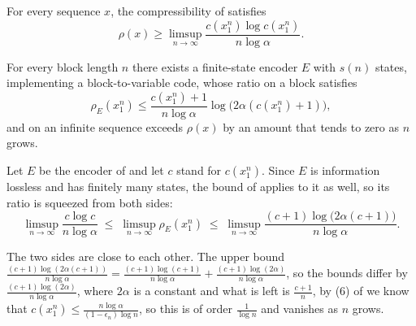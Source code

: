 
\begin{theorem}
\label{thm:lz78-lower}
    For every sequence \(x\), the compressibility of  satisfies
    \[
        \rho(x) \geq \limsup_{n \to \infty} \frac{c(x_1^n) \log c(x_1^n)}{n \log \alpha}.
    \]
\end{theorem}

\begin{theorem}
\label{thm:lz78-upper}
    For every block length \(n\) there exists a finite-state encoder \(E\) with \(s(n)\) states, implementing a block-to-variable code, whose ratio on a block satisfies
    \[
        \rho_E(x_1^n) \leq \frac{c(x_1^n) + 1}{n \log \alpha} \log \big( 2\alpha (c(x_1^n) + 1) \big),
    \]
    and on an infinite sequence exceeds \(\rho(x)\) by an amount that tends to zero as \(n\) grows.
\end{theorem}

\begin{corollary}
\label{cor:lz78-lower-upper}
    Let \(E\) be the encoder of  and let \(c\) stand for \(c(x_1^n)\). Since \(E\) is information lossless and has finitely many states, the bound of  applies to it as well, so its ratio is squeezed from both sides:
    \[
        \limsup_{n \to \infty} \frac{c \log c}{n \log \alpha}
        \;\leq\; \limsup_{n \to \infty} \rho_E(x_1^n) \;\leq\;
        \limsup_{n \to \infty} \frac{(c+1) \log\big(2\alpha(c+1)\big)}{n \log \alpha} .
    \]
\end{corollary}

\noindent The two sides are close to each other. The upper bound \(\frac{(c+1)\log(2\alpha(c+1))}{n \log \alpha} = \frac{(c+1)\log(c+1)}{n \log \alpha} + \frac{(c+1)\log(2\alpha)}{n \log \alpha}\), so the bounds differ by \(\frac{(c+1)\log(2\alpha)}{n \log \alpha}\), where \(2\alpha\) is a constant and what is left is \(\frac{c+1}{n}\), by (6) of \cite{ziv1978} we know that \(c(x_1^n) \leq \frac{n \log \alpha}{(1 - \epsilon_n)\log n}\), so this is of order \(\frac{1}{\log n}\) and vanishes as \(n\) grows.


